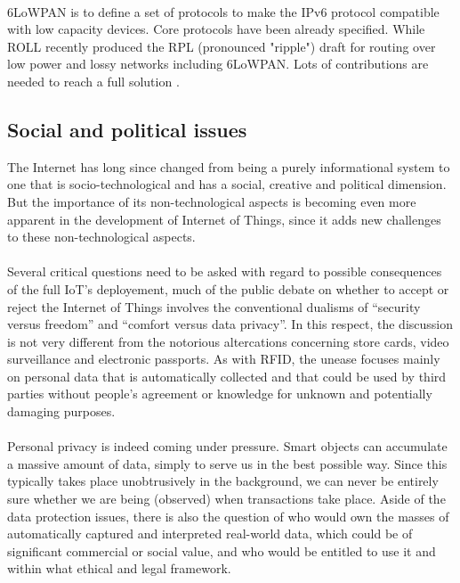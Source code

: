 \documentclass[10pt, twocolumn]{article}
\begin{document}
\paragraph{}
6LoWPAN is to define a set of protocols to make the IPv6 protocol compatible with low capacity devices. Core protocols have been already specified. While ROLL recently produced the RPL (pronounced "ripple") draft for routing over low power and lossy networks including 6LoWPAN. Lots of contributions are needed to reach a full solution \cite{ref7}.
\subsection{Social and political issues}
The Internet has long since changed from being a purely informational system to one that is socio-technological and has a social, creative and political dimension. But the importance of its non-technological aspects is becoming even more apparent in the development of Internet of Things, since it adds new challenges to these non-technological aspects.
\paragraph{}
Several critical questions need to be asked with regard to possible consequences of the full IoT's deployement, much of the public debate on whether to accept or reject the Internet of Things involves the conventional dualisms of “security versus freedom” and “comfort versus data privacy”. In this respect, the discussion is not very different from the notorious altercations concerning store cards, video surveillance and electronic passports. As with RFID, the unease focuses mainly on personal data that is automatically collected and that could be used by third parties without people’s agreement or knowledge
for unknown and potentially damaging purposes.
\paragraph{}
Personal privacy is indeed coming under pressure. Smart objects can accumulate a massive amount of data, simply to serve us in the best possible way. Since this typically takes place unobtrusively in the background, we can never be entirely sure whether we are being (observed) when transactions take place.
Aside of the data protection issues, there is also the question of who would own the masses of automatically captured and interpreted real-world data, which could be of significant commercial or social value, and who would be entitled to use it and within what ethical and legal framework.
\end{document}

